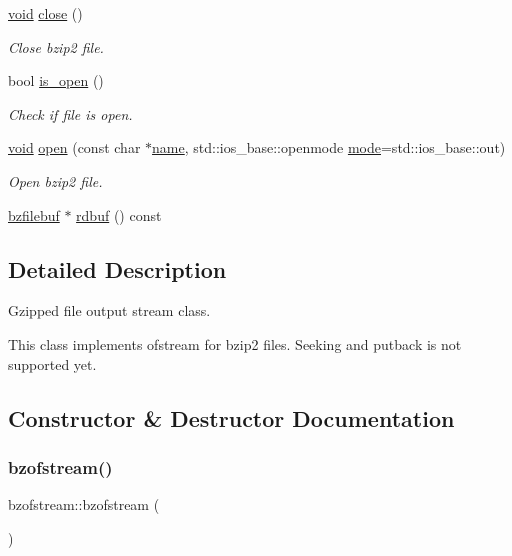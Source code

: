 \begin{DoxyCompactItemize}
\hyperlink{lp__lib_8h_ac7828c7b2b31d2e11af17bdb6289c5d9}{void} \hyperlink{classbzofstream_a7d26c80f20f44614d2635e948757fb1a}{close} ()
\begin{DoxyCompactList}\small\item\em Close bzip2 file. \end{DoxyCompactList}\item 
bool \hyperlink{classbzofstream_a9b827af5462beb0ffa2598b8b0bfbd98}{is\+\_\+open} ()
\begin{DoxyCompactList}\small\item\em Check if file is open. \end{DoxyCompactList}\item 
\hyperlink{lp__lib_8h_ac7828c7b2b31d2e11af17bdb6289c5d9}{void} \hyperlink{classbzofstream_ad8b9cdf55e3dc4c1777a12ddc1528744}{open} (const char $\ast$\hyperlink{lp__lib_8h_a2946c588fc7fa2fa5b43ac54b7872725}{name}, std\+::ios\+\_\+base\+::openmode \hyperlink{ioapi_8h_ab77191763734fbb3e515371393ccb606}{mode}=std\+::ios\+\_\+base\+::out)
\begin{DoxyCompactList}\small\item\em Open bzip2 file. \end{DoxyCompactList}\item 
\hyperlink{classbzfilebuf}{bzfilebuf} $\ast$ \hyperlink{classbzofstream_a63d4075162fb823e204b0df0f25c06f0}{rdbuf} () const
\end{DoxyCompactItemize}


\subsection{Detailed Description}
Gzipped file output stream class. 

This class implements ofstream for bzip2 files. Seeking and putback is not supported yet. 

\subsection{Constructor \& Destructor Documentation}
\mbox{\label{classbzofstream_aca9a7c301511e8fd4e3f999ce0cea80e}} 
\subsubsection{\texorpdfstring{bzofstream()}{bzofstream()}\hspace{0.1cm}{\footnotesize\ttfamily [1/3]}}
{\footnotesize\ttfamily bzofstream\+::bzofstream (\begin{DoxyParamCaption}{ }\end{DoxyParamCaption})}

